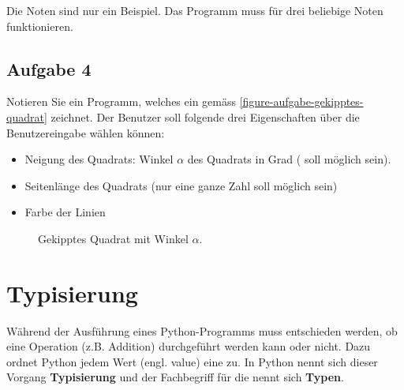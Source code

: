 Die Noten sind nur ein Beispiel. Das Programm muss für drei beliebige Noten funktionieren.

\fillwithgrid{2.5in}

\subsection{Aufgabe 4}

Notieren Sie ein Programm, welches ein  gemäss \autoref{figure-aufgabe-gekipptes-quadrat} zeichnet. Der Benutzer soll folgende drei Eigenschaften über die Benutzereingabe wählen können:

\begin{itemize}
\item Neigung des Quadrats: Winkel $\alpha$ des Quadrats in Grad ( soll möglich sein).
\item Seitenlänge des Quadrats (nur eine ganze Zahl soll möglich sein)
\item Farbe der Linien
\end{itemize}

\begin{figure}[htb]
\centering
\begin{minipage}{0.65\textwidth}
\centering
\fillwithgrid{3in}
\end{minipage}
\hfill
\begin{minipage}{0.3\textwidth}
\centering
{}
\caption{Gekipptes Quadrat mit Winkel $\alpha$.}
\label{figure-aufgabe-gekipptes-quadrat}
\end{minipage}
\end{figure}

\section{Typisierung}

Während der Ausführung eines Python-Programms muss entschieden werden, ob eine Operation (z.B. Addition) durchgeführt werden kann oder nicht. Dazu ordnet Python jedem Wert (engl. value) eine  zu. In Python nennt sich dieser Vorgang \textbf{Typisierung} und der Fachbegriff für die  nennt sich \textbf{Typen}.

